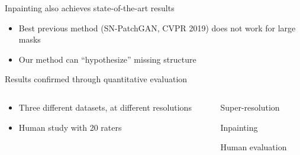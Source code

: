 \documentclass[8pt,xcolor=table,aspectratio=169]{beamer}
\begin{document}
\begin{frame}{Inpainting also achieves state-of-the-art results}

\begin{itemize}
 \item Best previous method (SN-PatchGAN, CVPR 2019) does not work for large masks
 \item Our method can ``hypothesize'' missing structure
\end{itemize}

\begin{center}
{}
\end{center}
 
\end{frame}


\begin{frame}{Results confirmed through quantitative evaluation}

\begin{columns}[t]
 \begin{column}{0.5\textwidth}
\begin{itemize}
 \item Three different datasets, at different resolutions
 
 \vt
 
 \item Human study with 20 raters
 
 
\end{itemize}
  
 \end{column}
 \begin{column}{0.5\textwidth}
 \centering

Super-resolution\\

\vo

Inpainting\\

\vo

Human evaluation\\

\end{column}

 
\end{columns}




 
\end{frame}
\end{document}
